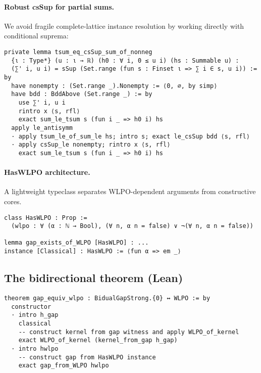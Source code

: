 \documentclass[11pt]{article}
\begin{document}
\paragraph{Robust csSup for partial sums.}
We avoid fragile complete-lattice instance resolution by working directly with conditional suprema:
\begin{lstlisting}[caption={tsum equals csSup of finite partial sums}]
private lemma tsum_eq_csSup_sum_of_nonneg
  {ι : Type*} (u : ι → ℝ) (h0 : ∀ i, 0 ≤ u i) (hs : Summable u) :
  (∑' i, u i) = sSup (Set.range (fun s : Finset ι => ∑ i ∈ s, u i)) := by
  have nonempty : (Set.range _).Nonempty := ⟨0, ∅, by simp⟩
  have bdd : BddAbove (Set.range _) := by
    use ∑' i, u i
    rintro x ⟨s, rfl⟩
    exact sum_le_tsum s (fun i _ => h0 i) hs
  apply le_antisymm
  · apply tsum_le_of_sum_le hs; intro s; exact le_csSup bdd ⟨s, rfl⟩
  · apply csSup_le nonempty; rintro x ⟨s, rfl⟩
    exact sum_le_tsum s (fun i _ => h0 i) hs
\end{lstlisting}

\paragraph{HasWLPO architecture.}
A lightweight typeclass separates WLPO-dependent arguments from constructive cores.

\begin{lstlisting}[caption={WLPO typeclass sketch}]
class HasWLPO : Prop :=
  (wlpo : ∀ (α : ℕ → Bool), (∀ n, α n = false) ∨ ¬(∀ n, α n = false))

lemma gap_exists_of_WLPO [HasWLPO] : ...
instance [Classical] : HasWLPO := ⟨fun α => em _⟩
\end{lstlisting}

\subsection{The bidirectional theorem (Lean)}

\begin{lstlisting}[caption={WLPO ↔ Gap (top-level equivalence)}]
theorem gap_equiv_wlpo : BidualGapStrong.{0} ↔ WLPO := by
  constructor
  · intro h_gap
    classical
    -- construct kernel from gap witness and apply WLPO_of_kernel
    exact WLPO_of_kernel (kernel_from_gap h_gap)
  · intro hwlpo
    -- construct gap from HasWLPO instance
    exact gap_from_WLPO hwlpo
\end{lstlisting}

\end{document}
